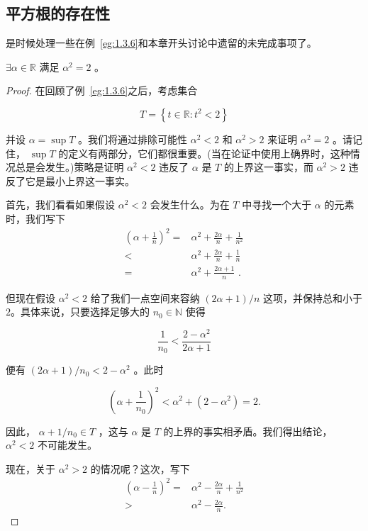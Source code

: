 \subsection{平方根的存在性}

是时候处理一些在例~\ref{eg:1.3.6}和本章开头讨论中遗留的未完成事项了。

\begin{Thm}
  \label{thm:1.4.5}
 \(\exists \alpha  \in  \mathbb{R}\) 满足 \({\alpha }^{2} = 2\) 。
\end{Thm}

\begin{proof}
在回顾了例~\ref{eg:1.3.6}之后，考虑集合

\[
T = \left\{  {t \in  \mathbb{R} : {t}^{2} < 2}\right\}
\]

并设 \(\alpha  = \sup T\) 。我们将通过排除可能性 \({\alpha }^{2} < 2\) 和 \({\alpha }^{2} > 2\) 来证明 \({\alpha }^{2} = 2\) 。请记住， \(\sup T\) 的定义有两部分，它们都很重要。(当在论证中使用上确界时，这种情况总是会发生。)策略是证明 \({\alpha }^{2} < 2\) 违反了 \(\alpha\) 是 \(T\) 的上界这一事实，而 \({\alpha }^{2} > 2\) 违反了它是最小上界这一事实。

首先，我们看看如果假设 \({\alpha }^{2} < 2\) 会发生什么。为在 $T$ 中寻找一个大于 \(\alpha\) 的元素时，我们写下
\begin{align*}
{\left( \alpha  + \frac{1}{n}\right) }^{2} =& {\alpha }^{2} + \frac{2\alpha }{n} + \frac{1}{{n}^{2}}\\
<& {\alpha }^{2} + \frac{2\alpha }{n} + \frac{1}{n}\\
= & {\alpha }^{2} + \frac{{2\alpha } + 1}{n}\text{ . }
\end{align*}

但现在假设 \({\alpha }^{2} < 2\) 给了我们一点空间来容纳 \(\left( {{2\alpha } + 1}\right) /n\) 这项，并保持总和小于$2$。具体来说，只要选择足够大的 \({n}_{0} \in  \mathbb{N}\) 使得

\[
\frac{1}{{n}_{0}} < \frac{2 - {\alpha }^{2}}{{2\alpha } + 1}
\]

便有 \(\left( {{2\alpha } + 1}\right) /{n}_{0} < 2 - {\alpha }^{2}\) 。此时

\[
{\left( \alpha  + \frac{1}{{n}_{0}}\right) }^{2} < {\alpha }^{2} + \left( {2 - {\alpha }^{2}}\right)  = 2.
\]

因此， \(\alpha  + 1/{n}_{0} \in  T\) ，这与 \(\alpha\) 是 \(T\) 的上界的事实相矛盾。我们得出结论， \({\alpha }^{2} < 2\) 不可能发生。

现在，关于 \({\alpha }^{2} > 2\) 的情况呢？这次，写下
\begin{align*}
{\left( \alpha  - \frac{1}{n}\right) }^{2} = & {\alpha }^{2} - \frac{2\alpha }{n} + \frac{1}{{n}^{2}}\\
> & {\alpha }^{2} - \frac{2\alpha }{n}.
\end{align*}
\end{proof}


